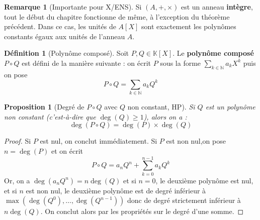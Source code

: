 \documentclass[french]{book}
\newcommand{\N}{\mathbb{N}}
\newcommand{\K}{\mathbb{K}}
\theoremstyle{plain}
\newtheorem{prop}{Proposition}[chapter]
\theoremstyle{definition}
\newtheorem{dfn}{Définition}[chapter]
\newtheorem{rmq}{Remarque}[chapter]
\theoremstyle{remark}
\begin{document}
\begin{rmq}[Importante pour X/ENS]
	Si $(A,+,\times)$ est un anneau \textbf{intègre}, tout le début du chapitre fonctionne de même, à l'exception du théorème précédent. Dans ce cas, les unités de $A[X]$ sont exactement les polynômes constants égaux aux unités de l'anneau $A$.
\end{rmq}
\begin{dfn}[Polynôme composé]
	Soit $P,Q\in\K[X]$. Le \textbf{polynôme composé $P\circ Q$} est défini de la manière suivante : on écrit $P$ sous la forme $\displaystyle \sum_{k\in\N}a_kX^k$ puis on pose $$P\circ Q=\sum_{k\in\N}a_kQ^k$$
\end{dfn}
\begin{prop}[Degré de $P\circ Q$ avec $Q$ non constant, HP]
	Si $Q$ est un polynôme non constant (c'est-à-dire que $\deg(Q)\geqslant1$), alors on a : $$\deg(P\circ Q)=\deg(P)\times\deg(Q)$$
\end{prop}
\begin{proof}
	Si $P$ est nul, on conclut immédiatement. Si $P$ est non nul,on pose $n=\deg(P)$ et on écrit $$P\circ Q=a_nQ^n+\sum_{k=0}^{n-1}a_kQ^k$$ Or, on a $\deg(a_nQ^n)=n\deg(Q)$ et si $n=0$, le deuxième polynôme est nul, et si $n$ est non nul, le deuxième polynôme est de degré inférieur à $\max(\deg(Q^0),\ldots,\deg(Q^{n-1}))$ donc de degré strictement inférieur à $n\deg(Q)$. On conclut alors par les propriétés sur le degré d'une somme.
\end{proof}
\end{document}
